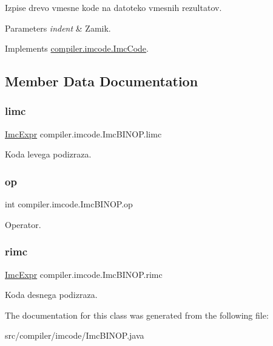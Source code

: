Izpise drevo vmesne kode na datoteko vmesnih rezultatov.


\begin{DoxyParams}{Parameters}
{\em indent} & Zamik. \\
\hline
\end{DoxyParams}


Implements \hyperlink{interfacecompiler_1_1imcode_1_1_imc_code_a26451dea2ab4dbd7054ac33f4c6d71fe}{compiler.\+imcode.\+Imc\+Code}.



\subsection{Member Data Documentation}
\mbox{\label{classcompiler_1_1imcode_1_1_imc_b_i_n_o_p_a9e1fe1962f67c6ed03e3661b1be7aff7}} 
\subsubsection{\texorpdfstring{limc}{limc}}
{\footnotesize\ttfamily \hyperlink{classcompiler_1_1imcode_1_1_imc_expr}{Imc\+Expr} compiler.\+imcode.\+Imc\+B\+I\+N\+O\+P.\+limc}

Koda levega podizraza. \mbox{\label{classcompiler_1_1imcode_1_1_imc_b_i_n_o_p_ade3e9590d2dcb9d3e4e6b40ae6dca023}} 
\subsubsection{\texorpdfstring{op}{op}}
{\footnotesize\ttfamily int compiler.\+imcode.\+Imc\+B\+I\+N\+O\+P.\+op}

Operator. \mbox{\label{classcompiler_1_1imcode_1_1_imc_b_i_n_o_p_a91fcda06e82a86fc5f0943968ade88a0}} 
\subsubsection{\texorpdfstring{rimc}{rimc}}
{\footnotesize\ttfamily \hyperlink{classcompiler_1_1imcode_1_1_imc_expr}{Imc\+Expr} compiler.\+imcode.\+Imc\+B\+I\+N\+O\+P.\+rimc}

Koda desnega podizraza. 

The documentation for this class was generated from the following file\+:\begin{DoxyCompactItemize}
\item 
src/compiler/imcode/Imc\+B\+I\+N\+O\+P.\+java\end{DoxyCompactItemize}
